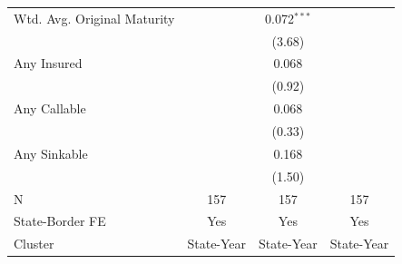 \begin{tabular*}{\textwidth}{@{\extracolsep{\fill}}lccc}
   Wtd. Avg. Original Maturity &                & 0.072$^{***}$          &   \\   
                               &                & (3.68)                &   \\   
   Any Insured                 &                & 0.068                  &   \\   
                               &                & (0.92)                &   \\   
   Any Callable                &                & 0.068                  &   \\   
                               &                & (0.33)                &   \\   
   Any Sinkable                &                & 0.168                  &   \\   
                               &                & (1.50)                &   \\   
   \hline
   N                & 157            & 157                    & 157\\  
   State-Border FE             & Yes            & Yes                    & Yes\\  
   Cluster              & State-Year & State-Year & State-Year\\  
   \bottomrule
\end{tabular*}
\par\endgroup
